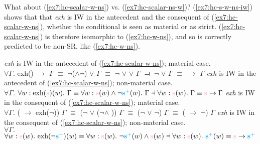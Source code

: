 \begin{exe}
	\ex
	\begin{xlist}
		 \label{ex7:sr-hc-sw}
		 \label{ex7:sr-hc-ws}
	\end{xlist} 
	
\end{exe}

What about (\ref{ex7:hc-scalar-w-ns}) vs. (\ref{ex7:hc-scalar-ns-w})? (\ref{ex7:hc-s-w-ns-iw}) shows that that \textit{exh} is IW in the antecedent and the consequent of (\ref{ex7:hc-scalar-w-ns}), whether the conditional is seen as material or as strict. (\ref{ex7:hc-scalar-w-ns}) is therefore isomorphic to (\ref{ex7:hc-w-ns}), and so is correctly predicted to be non-SR, like (\ref{ex7:hc-w-ns}).




\begin{exe}
	\ex\label{ex7:hc-s-w-ns-iw}
	\begin{xlist}
		\ex\textit{exh} is IW in the antecedent of (\ref{ex7:hc-scalar-w-ns}); material case.\\ $\forall \Gamma.$ exh(\s) $\rightarrow$ $\Gamma$ $\equiv$ $\neg$(\s$\wedge$$\neg$\splus) $\vee$ $\Gamma$ $\equiv$ $\neg$\s{} $\vee$ \splus{} $\vee$ $\Gamma$ $\Dashv$ $\neg$\s{} $\vee$ $\Gamma$ $\equiv$ \s{} $\rightarrow$ $\Gamma$
		\ex\textit{exh} is IW in the antecedent of (\ref{ex7:hc-scalar-w-ns}); non-material case.\\ $\forall \Gamma.$ $\forall w: \text{exh}(\s)(w). \ \Gamma \equiv \forall w: \s(w) \wedge \neg\splus(w). \ \Gamma \Dashv \forall w: \s(w). \ \Gamma \equiv \s{} \rightarrow \Gamma$
		\ex\textit{exh} is IW in the consequent of (\ref{ex7:hc-scalar-w-ns}); material case.\\
		$\forall \Gamma.$ (\s{} $\rightarrow$ exh($\neg$\splus)) $\Gamma$ $\equiv$ ($\neg$\s{} $\vee$ ($\neg$\splus $\wedge$ \s)) $\Gamma$ $\equiv$ ($\neg$\s{} $\vee$ $\neg$\splus) $\Gamma$ $\equiv$ (\s{} $\rightarrow$ $\neg$\splus) $\Gamma$
		\ex\textit{exh} is IW in the consequent of (\ref{ex7:hc-scalar-w-ns}); non-material case.\\$\forall \Gamma.$ $\forall w: \s(w). \ \text{exh}(\neg\splus)(w) \equiv \forall w: \s(w). \ \neg\splus(w) \wedge \s(w) \Dashv \forall w: \s(w). \ \splus(w) \equiv \s{} \rightarrow \splus$
	\end{xlist}
\end{exe}


